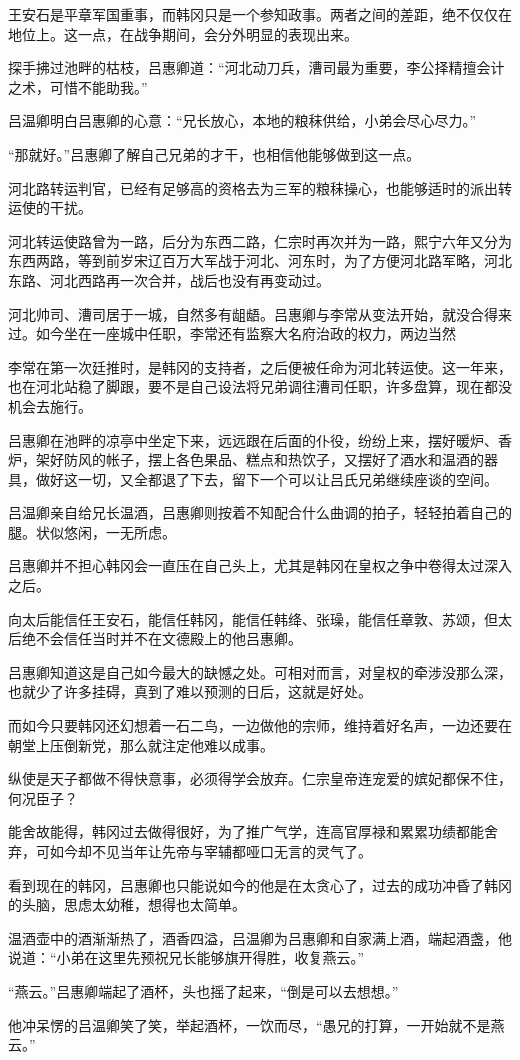 王安石是平章军国重事，而韩冈只是一个参知政事。两者之间的差距，绝不仅仅在地位上。这一点，在战争期间，会分外明显的表现出来。

探手拂过池畔的枯枝，吕惠卿道：“河北动刀兵，漕司最为重要，李公择精擅会计之术，可惜不能助我。”

吕温卿明白吕惠卿的心意：“兄长放心，本地的粮秣供给，小弟会尽心尽力。”

“那就好。”吕惠卿了解自己兄弟的才干，也相信他能够做到这一点。

河北路转运判官，已经有足够高的资格去为三军的粮秣操心，也能够适时的派出转运使的干扰。

河北转运使路曾为一路，后分为东西二路，仁宗时再次并为一路，熙宁六年又分为东西两路，等到前岁宋辽百万大军战于河北、河东时，为了方便河北路军略，河北东路、河北西路再一次合并，战后也没有再变动过。

河北帅司、漕司居于一城，自然多有龃龉。吕惠卿与李常从变法开始，就没合得来过。如今坐在一座城中任职，李常还有监察大名府治政的权力，两边当然

李常在第一次廷推时，是韩冈的支持者，之后便被任命为河北转运使。这一年来，也在河北站稳了脚跟，要不是自己设法将兄弟调往漕司任职，许多盘算，现在都没机会去施行。

吕惠卿在池畔的凉亭中坐定下来，远远跟在后面的仆役，纷纷上来，摆好暖炉、香炉，架好防风的帐子，摆上各色果品、糕点和热饮子，又摆好了酒水和温酒的器具，做好这一切，又全都退了下去，留下一个可以让吕氏兄弟继续座谈的空间。

吕温卿亲自给兄长温酒，吕惠卿则按着不知配合什么曲调的拍子，轻轻拍着自己的腿。状似悠闲，一无所虑。

吕惠卿并不担心韩冈会一直压在自己头上，尤其是韩冈在皇权之争中卷得太过深入之后。

向太后能信任王安石，能信任韩冈，能信任韩绛、张璪，能信任章敦、苏颂，但太后绝不会信任当时并不在文德殿上的他吕惠卿。

吕惠卿知道这是自己如今最大的缺憾之处。可相对而言，对皇权的牵涉没那么深，也就少了许多挂碍，真到了难以预测的日后，这就是好处。

而如今只要韩冈还幻想着一石二鸟，一边做他的宗师，维持着好名声，一边还要在朝堂上压倒新党，那么就注定他难以成事。

纵使是天子都做不得快意事，必须得学会放弃。仁宗皇帝连宠爱的嫔妃都保不住，何况臣子？

能舍故能得，韩冈过去做得很好，为了推广气学，连高官厚禄和累累功绩都能舍弃，可如今却不见当年让先帝与宰辅都哑口无言的灵气了。

看到现在的韩冈，吕惠卿也只能说如今的他是在太贪心了，过去的成功冲昏了韩冈的头脑，思虑太幼稚，想得也太简单。

温酒壶中的酒渐渐热了，酒香四溢，吕温卿为吕惠卿和自家满上酒，端起酒盏，他说道：“小弟在这里先预祝兄长能够旗开得胜，收复燕云。”

“燕云。”吕惠卿端起了酒杯，头也摇了起来，“倒是可以去想想。”

他冲呆愣的吕温卿笑了笑，举起酒杯，一饮而尽，“愚兄的打算，一开始就不是燕云。”
